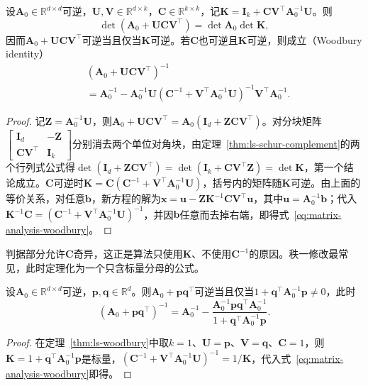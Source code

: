 \begin{theorem}[Woodbury恒等式]
\label{thm:ls-woodbury}
设$\bm A_0\in\mathbb R^{d\times d}$可逆，$\bm U,\bm V\in\mathbb R^{d\times k}$，$\bm C\in\mathbb R^{k\times k}$，记$\bm K=\bm I_k+\bm C\bm V^\top\bm A_0^{-1}\bm U$。则
\[
 \det(\bm A_0+\bm U\bm C\bm V^\top)=\det\bm A_0\det\bm K,
\]
因而$\bm A_0+\bm U\bm C\bm V^\top$可逆当且仅当$\bm K$可逆。若$\bm C$也可逆且$\bm K$可逆，则成立（Woodbury identity）
\begin{equation}
\begin{aligned}
 &(\bm A_0+\bm U\bm C\bm V^\top)^{-1}\\
 &=\bm A_0^{-1}-\bm A_0^{-1}\bm U
 (\bm C^{-1}+\bm V^\top\bm A_0^{-1}\bm U)^{-1}
 \bm V^\top\bm A_0^{-1}.
\end{aligned}
\label{eq:matrix-analysis-woodbury}
\end{equation}
\end{theorem}
\begin{proof}
记$\bm Z=\bm A_0^{-1}\bm U$，则$\bm A_0+\bm U\bm C\bm V^\top=\bm A_0(\bm I_d+\bm Z\bm C\bm V^\top)$。对分块矩阵$\left[\begin{smallmatrix}\bm I_d&-\bm Z\\\bm C\bm V^\top&\bm I_k\end{smallmatrix}\right]$分别消去两个单位对角块，由定理~\ref{thm:ls-schur-complement}的两个行列式公式得$\det(\bm I_d+\bm Z\bm C\bm V^\top)=\det(\bm I_k+\bm C\bm V^\top\bm Z)=\det\bm K$，第一个结论成立。$\bm C$可逆时$\bm K=\bm C(\bm C^{-1}+\bm V^\top\bm A_0^{-1}\bm U)$，括号内的矩阵随$\bm K$可逆。由上面的等价关系，对任意$\bm b$，新方程的解为$\bm x=\bm u-\bm Z\bm K^{-1}\bm C\bm V^\top\bm u$，其中$\bm u=\bm A_0^{-1}\bm b$；代入$\bm K^{-1}\bm C=(\bm C^{-1}+\bm V^\top\bm A_0^{-1}\bm U)^{-1}$，并因$\bm b$任意而去掉右端，即得式~\eqref{eq:matrix-analysis-woodbury}。
\end{proof}

判据部分允许$\bm C$奇异，这正是算法只使用$\bm K$、不使用$\bm C^{-1}$的原因。秩一修改最常见，此时定理化为一个只含标量分母的公式。

\begin{theorem}
\label{thm:ls-sherman-morrison}
设$\bm A_0\in\mathbb R^{d\times d}$可逆，$\bm p,\bm q\in\mathbb R^d$。则$\bm A_0+\bm p\bm q^\top$可逆当且仅当$1+\bm q^\top\bm A_0^{-1}\bm p\neq0$，此时
\[
 (\bm A_0+\bm p\bm q^\top)^{-1}
 =\bm A_0^{-1}-\frac{\bm A_0^{-1}\bm p\bm q^\top\bm A_0^{-1}}{1+\bm q^\top\bm A_0^{-1}\bm p}.
\]
\end{theorem}
\begin{proof}
在定理~\ref{thm:ls-woodbury}中取$k=1$、$\bm U=\bm p$、$\bm V=\bm q$、$\bm C=1$，则$\bm K=1+\bm q^\top\bm A_0^{-1}\bm p$是标量，$(\bm C^{-1}+\bm V^\top\bm A_0^{-1}\bm U)^{-1}=1/\bm K$，代入式~\eqref{eq:matrix-analysis-woodbury}即得。
\end{proof}

